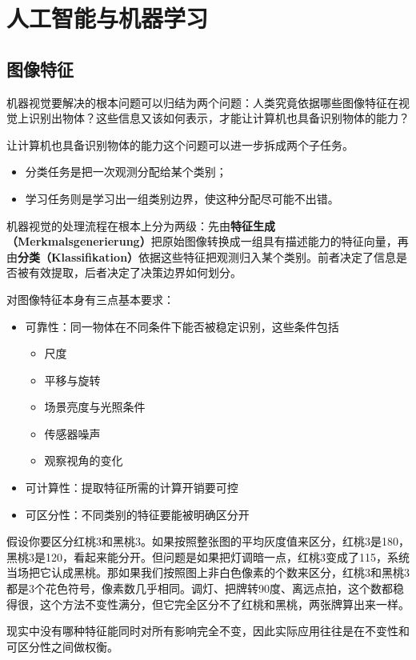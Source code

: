 \section{人工智能与机器学习}
\label{sec:aiml}

\subsection{图像特征}

机器视觉要解决的根本问题可以归结为两个问题：人类究竟依据哪些图像特征在视觉上识别出物体？这些信息又该如何表示，才能让计算机也具备识别物体的能力？

让计算机也具备识别物体的能力这个问题可以进一步拆成两个子任务。
\begin{itemize}
  \item 分类任务是把一次观测分配给某个类别；
  \item 学习任务则是学习出一组类别边界，使这种分配尽可能不出错。
\end{itemize}
机器视觉的处理流程在根本上分为两级：先由\textbf{特征生成（Merkmalsgenerierung）}把原始图像转换成一组具有描述能力的特征向量，再由\textbf{分类（Klassifikation）}依据这些特征把观测归入某个类别。前者决定了信息是否被有效提取，后者决定了决策边界如何划分。

对图像特征本身有三点基本要求：
\begin{itemize}
  \item 可靠性：同一物体在不同条件下能否被稳定识别，这些条件包括
  \begin{itemize}
    \item 尺度
    \item 平移与旋转
    \item 场景亮度与光照条件
    \item 传感器噪声
    \item 观察视角的变化
  \end{itemize}
  \item 可计算性：提取特征所需的计算开销要可控
  \item 可区分性：不同类别的特征要能被明确区分开
\end{itemize}
假设你要区分红桃3和黑桃3。如果按照整张图的平均灰度值来区分，红桃3是180，黑桃3是120，看起来能分开。但问题是如果把灯调暗一点，红桃3变成了115，系统当场把它认成黑桃。那如果我们按照图上非白色像素的个数来区分，红桃3和黑桃3都是3个花色符号，像素数几乎相同。调灯、把牌转90度、离远点拍，这个数都稳得很，这个方法不变性满分，但它完全区分不了红桃和黑桃，两张牌算出来一样。

现实中没有哪种特征能同时对所有影响完全不变，因此实际应用往往是在不变性和可区分性之间做权衡。


